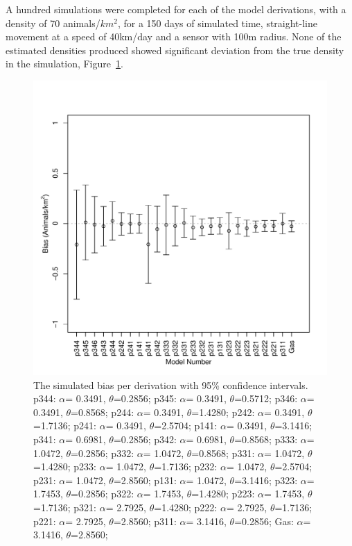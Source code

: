 \documentclass[a4paper,10pt,reqno,oneside]{amsart}
\begin{document}
A hundred simulations were completed for each of the model derivations, with a density of 70 animals/$km^2$, for a 150 days of simulated time, straight-line movement at a speed of 40km/day and a sensor with 100m radius. None of the estimated densities produced showed significant deviation from the true density in the simulation, Figure~\ref{f:ModelBias}.
\begin{figure}
\centering
\includegraphics[width=1\textwidth]{imgs/AverageModelBias.pdf}
\caption{The simulated bias per derivation with 95\% confidence intervals.
 p344: $\alpha$= 0.3491, $\theta$=0.2856;  
 p345: $\alpha$= 0.3491, $\theta$=0.5712;
 p346: $\alpha$= 0.3491, $\theta$=0.8568;
 p244: $\alpha$= 0.3491, $\theta$=1.4280;
 p242: $\alpha$= 0.3491, $\theta$=1.7136;
 p241: $\alpha$= 0.3491, $\theta$=2.5704;
 p141: $\alpha$= 0.3491, $\theta$=3.1416;
 p341: $\alpha$= 0.6981, $\theta$=0.2856; 
 p342: $\alpha$= 0.6981, $\theta$=0.8568;
 p333: $\alpha$= 1.0472, $\theta$=0.2856;      
 p332: $\alpha$= 1.0472, $\theta$=0.8568;
 p331: $\alpha$= 1.0472, $\theta$=1.4280;
 p233: $\alpha$= 1.0472, $\theta$=1.7136;
 p232: $\alpha$= 1.0472, $\theta$=2.5704;
 p231: $\alpha$= 1.0472, $\theta$=2.8560;
 p131: $\alpha$= 1.0472, $\theta$=3.1416;
 p323: $\alpha$= 1.7453, $\theta$=0.2856;  
 p322: $\alpha$= 1.7453, $\theta$=1.4280;
 p223: $\alpha$= 1.7453, $\theta$=1.7136;       
 p321: $\alpha$= 2.7925, $\theta$=1.4280;         
 p222: $\alpha$= 2.7925, $\theta$=1.7136; 
 p221: $\alpha$= 2.7925, $\theta$=2.8560;       
 p311: $\alpha$= 3.1416, $\theta$=0.2856;  
 Gas: $\alpha$= 3.1416, $\theta$=2.8560;                                         
    }
\label{f:ModelBias}
\end{figure}
\end{document}
